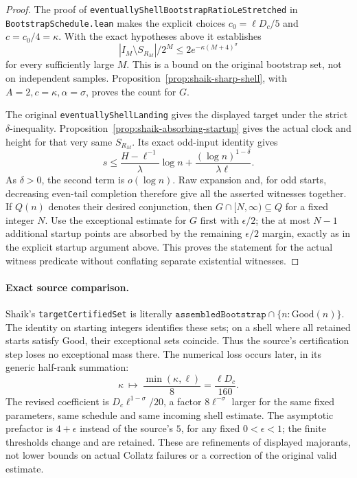 \documentclass[11pt]{article}
\theoremstyle{remark}\newtheorem{remark}[proposition]{Remark}
\begin{document}
\begin{proof}
The proof of
\texttt{eventuallyShellBootstrapRatioLeStretched} in
\texttt{BootstrapSchedule.lean} makes the explicit choices
\(c_0=\ell D_c/5\) and \(c=c_0/4=\kappa\).
With the exact hypotheses above it establishes
\[
 |I_M\setminus S_{R_M}|/2^M
 \le2e^{-\kappa(M+4)^\sigma}
\]
for every sufficiently large \(M\).
This is a bound on the original bootstrap set, not on independent
samples. Proposition~\ref{prop:shaik-sharp-shell}, with
\(A=2,c=\kappa,\alpha=\sigma\), proves the count for \(G\).

The original \texttt{eventuallyShellLanding} gives the displayed
target under the strict \(\delta\)-inequality.
Proposition~\ref{prop:shaik-absorbing-startup} gives the actual
clock and height for that very same \(S_{R_M}\).
Its exact odd-input identity gives
\[
 s\le\frac{H-\ell^{-1}}{\lambda}\log n+
              \frac{(\log n)^{1-\delta}}{\lambda\ell}.
\]
As \(\delta>0\), the second term is \(o(\log n)\).
Raw expansion and, for odd starts, decreasing even-tail completion
therefore give all the asserted witnesses together.
If \(Q(n)\) denotes their desired conjunction, then
\(G\cap[N,\infty)\subseteq Q\) for a fixed integer \(N\).
Use the exceptional estimate for \(G\) first with \(\epsilon/2\);
the at most \(N-1\) additional startup points are absorbed by the
remaining \(\epsilon/2\) margin, exactly as in the explicit startup
argument above. This proves the statement for the actual witness
predicate without conflating separate existential witnesses.
\end{proof}

\paragraph{Exact source comparison.}
Shaik's \texttt{targetCertifiedSet} is literally
\(\texttt{assembledBootstrap}\cap\{n:\mathrm{Good}(n)\}\).
The identity on starting integers identifies these sets; on a shell
where all retained starts satisfy \(\mathrm{Good}\), their exceptional
sets coincide. Thus the source's certification step loses no
exceptional mass there. The numerical loss occurs later, in its
generic half-rank summation:
\[
 \kappa\ \longmapsto\ \frac{\min(\kappa,\ell)}8
        =\frac{\ell D_c}{160}.
\]
The revised coefficient is \(D_c\ell^{1-\sigma}/20\), a factor
\(8\ell^{-\sigma}\) larger for the same fixed parameters, same
schedule and same incoming shell estimate. The asymptotic prefactor
is \(4+\epsilon\) instead of the source's \(5\), for any fixed
\(0<\epsilon<1\); the finite thresholds change and are retained.
These are refinements of displayed majorants, not lower bounds on
actual Collatz failures or a correction of the original valid estimate.
\end{document}
